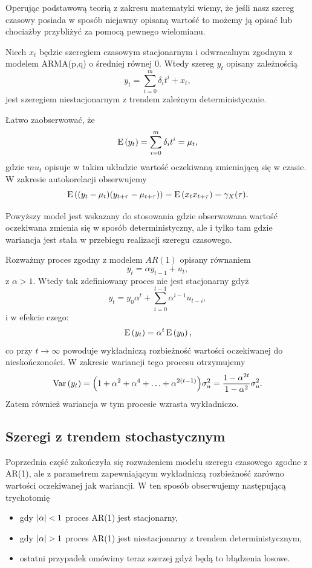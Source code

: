 \documentclass[10pt,a4paper]{book}
\begin{document}
Operując podstawową teorią z zakresu matematyki wiemy, że jeśli nasz szereg czasowy posiada w sposób niejawny opisaną wartość to możemy ją opisać lub chociażby przybliżyć za pomocą pewnego wielomianu. 

\begin{remark}
Niech $x_t$ będzie szeregiem czasowym stacjonarnym i odwracalnym zgodnym z modelem ARMA(p,q) o średniej równej 0. Wtedy szereg $y_t$ opisany zależnością 
$$
y_t = \sum_{i=0}^{m} \delta_i t^i + x_t,
$$
jest szeregiem niestacjonarnym z trendem zależnym deterministycznie. 

Łatwo zaobserwować, że 
$$
\Ex{y_t} = \sum_{i=0}^{m} \delta_i t^i = \mu_t,
$$
gdzie $mu_t$ opisuje w takim układzie wartość oczekiwaną zmieniającą się w czasie. W zakresie autokorelacji obserwujemy
$$
\operatorname{E} \left({ (y_t - \mu_t) (y_{t+\tau} - \mu_{t+\tau})} \right) = \operatorname{E} \left({x_t x_{t+\tau}} \right) = \gamma_X(\tau).
$$
\end{remark}

Powyższy model jest wskazany do stosowania gdzie obserwowana wartość oczekiwana zmienia się w sposób deterministyczny, ale i tylko tam gdzie wariancja jest stała w przebiegu realizacji szeregu czasowego.

\begin{remark}
Rozważmy proces zgodny z modelem $AR(1)$ opisany równaniem
$$
y_t = \alpha y_{t-1} + u_t,
$$
z $\alpha > 1$. Wtedy tak zdefiniowany proces nie jest stacjonarny gdyż
$$
y_t = y_0 \alpha^t + \sum_{i=0}^{t-1} \alpha^{i-1} u_{t-i},
$$ 
i w efekcie czego:
$$
\operatorname{E} \left({y_t} \right) = \alpha^t \operatorname{E} \left({y_0} \right),
$$
co przy $t \to \infty$ powoduje wykładniczą rozbieżność wartości oczekiwanej do nieskończoności. W zakresie wariancji tego procesu otrzymujemy
$$
\operatorname{Var} \left( {y_t} \right) = {\left( {1+\alpha^2+\alpha^4+\ldots+\alpha^{2(t-1)}} \right)} \sigma^2_u = \frac{1-\alpha^{2t}}{1-\alpha^2	} \sigma^2_u.
$$
Zatem również wariancja w tym procesie wzrasta wykładniczo. 
\end{remark}

\subsection{Szeregi z trendem stochastycznym}

Poprzednia część zakończyła się rozważeniem modelu szeregu czasowego zgodne z AR(1), ale z parametrem zapewniającym wykładniczą rozbieżność zarówno wartości oczekiwanej jak wariancji.
W ten sposób obserwujemy następującą trychotomię
\begin{itemize}
\item gdy ${\left| {\alpha} \right|} < 1$ proces AR(1) jest stacjonarny,
\item gdy ${\left| {\alpha} \right|} > 1$ proces AR(1) jest niestacjonarny z trendem deterministycznym,
\item ostatni przypadek omówimy teraz szerzej gdyż będą to błądzenia losowe. 
\end{itemize}
\end{document}
